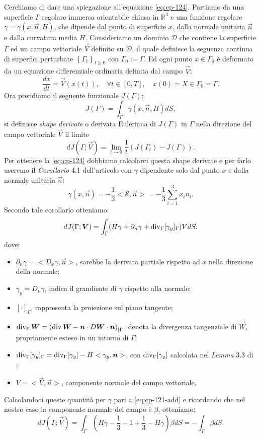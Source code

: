 \begin{osservazione}
\label{oss:cp-122}
Cerchiamo di dare una spiegazione all'equazione \eqref{eq:cp-124}. Partiamo da una superficie $\Gamma$ regolare immersa orientabile chiusa in $\mathbb{R}^3$
e una funzione regolare $\gamma=\gamma(x,\vec{n},H)$, che dipende dal punto di superficie $x$, dalla normale unitaria $\vec{n}$ e dalla curvatura media $H$.
Consideriamo un dominio $\mathcal{D}$ che contiene la superficie $\Gamma$ ed un campo vettoriale $\vec{V}$ definito su $\mathcal{D}$, il quale definisce la seguenza continua di superfici perturbate $\left\{\Gamma_t\right\}_{t\ge 0}$ con $\Gamma_0:=\Gamma$. Ed ogni punto $x\in \Gamma_0$ è deformato da un equazione differenziale ordinaria definita dal campo $\vec{V}$:
\[
\frac{dx}{dt}=\vec{V}(x(t)),\quad \forall t\in[0,T],\quad x(0)=X\in\Gamma_0=\Gamma.
\]
Ora prendiamo il seguente funzionale $J(\Gamma)$:
\[
J(\Gamma) = \int_{\Gamma}\gamma(x,\vec{n},H)dS,
\]
si definisce \emph{shape derivate} o derivata Euleriana di $J(\Gamma)$ in $\Gamma$ nella direzione del campo vettoriale $\vec{V}$ il limite
\[
dJ(\Gamma;\vec{V}) = \lim_{t\to 0}\frac{1}{t}(J(\Gamma_t)-J(\Gamma)).
\]
Per ottenere la \eqref{eq:cp-124} dobbiamo calcolarci questa shape
derivate e per farlo useremo il \emph{Corollario} 4.1 dell'articolo \cite[][]{dog:noch} con $\gamma$ dipendente solo dal punto $x$ e dalla normale unitaria $\vec{n}$: 
\begin{equation}
\label{eq:cp-121-add}
\gamma(x,\vec{n})=-\frac{1}{3}<\mathcal{S},\vec{n}> = -\frac{1}{3}\sum_{i=1}^3x_in_i.
\end{equation}
Secondo tale corollario otteniamo:
\[
dJ(\Gamma;\bm{V}) = \int_{\Gamma}(H\gamma+\partial_{n}\gamma+\operatorname{div}_{\Gamma}[\gamma_y]_{\Gamma})VdS.
\]
dove:
\begin{itemize}
  \item $\partial_n\gamma=<D_x\gamma,\vec{n}>$, sarebbe la derivata partiale rispetto ad $x$ nella direzione della normale;
  \item $\gamma_y=D_n\gamma$, indica il grandiente di $\gamma$ rispetto alla normale;
  \item $[\cdot]_{\Gamma}$, rappresenta la proiezione sul piano tangente;
  \item $\operatorname{div}_{\Gamma}\bm{W}=\left(\operatorname{div}\bm{W}-\bm{n}\cdot D\bm{W} \cdot \bm{n}\right)_{|\Gamma}$, denota la divergenza tangenziale di $\vec{W}$, propriamente esteso in un intorno di $\Gamma$;
  \item $\operatorname{div}_{\Gamma}[\gamma_y]_{\Gamma}=\operatorname{div}_{\Gamma}[\gamma_y]-H<\gamma_y,\bm{n}>$, con $\operatorname{div}_{\Gamma}[\gamma_y]$ calcolata nel \emph{Lemma} 3.3 di \cite[][]{dog:noch};
  \item $V=<\vec{V},\vec{n}>$, componente normale del campo vettoriale.
\end{itemize}
Calcolandoci queste quantità per $\gamma$ pari a \eqref{eq:cp-121-add} e ricordando che nel nostro caso la componente normale del campo è $\beta$,  otteniamo:
\[
dJ(\Gamma;\vec{V})=\int_{\Gamma}(H\gamma -\frac{1}{3} -1 +\frac{1}{3} -H\gamma)\beta dS=-\int_{\Gamma}\beta dS.
\]
\end{osservazione}
%
%
%
%
